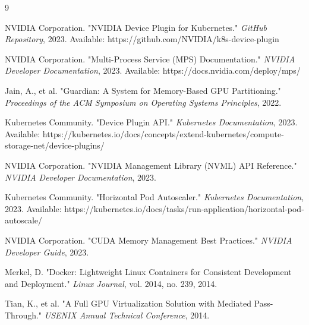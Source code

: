 \documentclass[10pt,twocolumn,letterpaper]{article}
\begin{document}
\begin{thebibliography}{9}

NVIDIA Corporation. "NVIDIA Device Plugin for Kubernetes." \textit{GitHub Repository}, 2023. Available: https://github.com/NVIDIA/k8s-device-plugin

NVIDIA Corporation. "Multi-Process Service (MPS) Documentation." \textit{NVIDIA Developer Documentation}, 2023. Available: https://docs.nvidia.com/deploy/mps/

Jain, A., et al. "Guardian: A System for Memory-Based GPU Partitioning." \textit{Proceedings of the ACM Symposium on Operating Systems Principles}, 2022.

Kubernetes Community. "Device Plugin API." \textit{Kubernetes Documentation}, 2023. Available: https://kubernetes.io/docs/concepts/extend-kubernetes/compute-storage-net/device-plugins/

NVIDIA Corporation. "NVIDIA Management Library (NVML) API Reference." \textit{NVIDIA Developer Documentation}, 2023.

Kubernetes Community. "Horizontal Pod Autoscaler." \textit{Kubernetes Documentation}, 2023. Available: https://kubernetes.io/docs/tasks/run-application/horizontal-pod-autoscale/

NVIDIA Corporation. "CUDA Memory Management Best Practices." \textit{NVIDIA Developer Guide}, 2023.

Merkel, D. "Docker: Lightweight Linux Containers for Consistent Development and Deployment." \textit{Linux Journal}, vol. 2014, no. 239, 2014.

Tian, K., et al. "A Full GPU Virtualization Solution with Mediated Pass-Through." \textit{USENIX Annual Technical Conference}, 2014.

\end{thebibliography}
\end{document}
